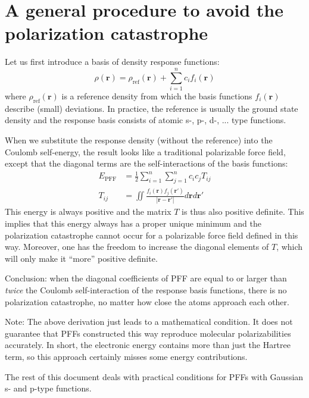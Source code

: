 \documentclass[a4paper,12pt,parskip=half]{scrartcl}
\begin{document}
\section{A general procedure to avoid the polarization catastrophe}

Let us first introduce a basis of density response functions:
%
\begin{equation}
    \rho(\mathbold{r}) = \rho_\text{ref}(\mathbold{r}) + \sum_{i=1}^n c_i f_i(\mathbold{r})
\end{equation}
%
where $\rho_\text{ref}(\mathbold{r})$ is a reference density from which the basis functions $f_i(\mathbold{r})$ describe (small) deviations. In practice, the reference is usually the ground state density and the response basis consists of atomic s-, p-, d-, ... type functions.

When we substitute the response density (without the reference) into the Coulomb self-energy, the result looks like a traditional polarizable force field, except that the diagonal terms are the self-interactions of the basis functions:
%
\begin{align}
    E_\text{PFF} &= \frac{1}{2} \sum_{i=1}^n \sum_{j=1}^n c_i c_j T_{ij} \\
    \label{eq:pff_matrix}
    T_{ij} &= \iint \frac{ f_i(\mathbold{r}) f_j(\mathbold{r}') }{| \mathbold{r} - \mathbold{r}' |} d\mathbold{r} d\mathbold{r}'
\end{align}
%
This energy is always positive and the matrix $T$ is thus also positive definite. This implies that this energy always has a proper unique minimum and the polarization catastrophe cannot occur for a polarizable force field defined in this way. Moreover, one has the freedom to increase the diagonal elements of $T$, which will only make it ``more'' positive definite.

Conclusion: when the diagonal coefficients of PFF are equal to or larger than \textit{twice} the Coulomb self-interaction of the response basis functions, there is no polarization catastrophe, no matter how close the atoms approach each other.

Note: The above derivation just leads to a mathematical condition. It does not guarantee that PFFs constructed this way reproduce molecular polarizabilities accurately. In short, the electronic energy contains more than just the Hartree term, so this approach certainly misses some energy contributions.

The rest of this document deals with practical conditions for PFFs with Gaussian s- and p-type functions.
\end{document}
